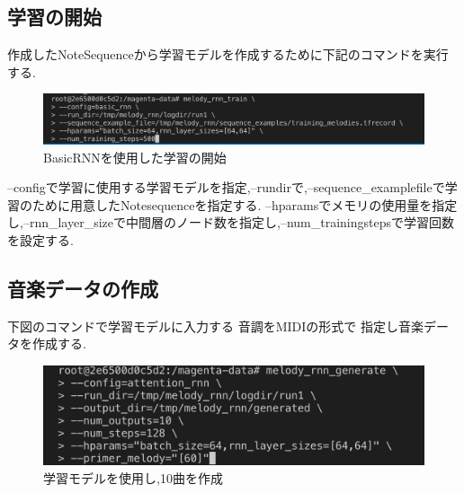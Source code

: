 \subsection{学習の開始}
作成したNoteSequenceから学習モデルを作成するために下記のコマンドを実行する.
\begin{figure}[!ht]
    \begin{screen}
    \begin{center}
        \includegraphics[scale=0.5, clip]{./img/Rnn_train.png}
        \caption{BasicRNNを使用した学習の開始}
        \label{fig:BasicRNNを使用した学習の開始}
    \end{center}
    \end{screen}
\end{figure}
--configで学習に使用する学習モデルを指定,--rundirで,--sequence\_examplefileで学習のために用意したNotesequenceを指定する.
--hparamsでメモリの使用量を指定し,--rnn\_layer\_sizeで中間層のノード数を指定し,--num\_trainingstepsで学習回数を設定する.\\
\newpage
\subsection{音楽データの作成}
下図のコマンドで学習モデルに入力する 音調をMIDIの形式で 指定し音楽データを作成する.
\begin{figure}[!ht]
    \begin{screen}
    \begin{center}
        \includegraphics[scale=0.7, clip]{./img/MIDI_make.png}
        \caption{学習モデルを使用し,10曲を作成}
        \label{fig:学習モデルを使用し,10曲を作成}
    \end{center}
    \end{screen}
\end{figure}
